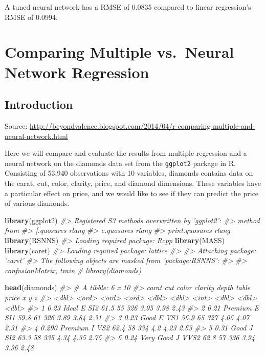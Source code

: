 \documentclass[]{book}
\newenvironment{Shaded}{\begin{snugshade}}{\end{snugshade}}
\newcommand{\CommentTok}[1]{\textcolor[rgb]{0.56,0.35,0.01}{\textit{#1}}}
\newcommand{\KeywordTok}[1]{\textcolor[rgb]{0.13,0.29,0.53}{\textbf{#1}}}
\newcommand{\NormalTok}[1]{#1}
\begin{document}
A tuned neural network has a RMSE of 0.0835 compared to linear regression's RMSE of 0.0994.

\hypertarget{comparing-multiple-vs.neural-network-regression}{%
\chapter{Comparing Multiple vs.~Neural Network Regression}\label{comparing-multiple-vs.neural-network-regression}}

\hypertarget{introduction-3}{%
\section{Introduction}\label{introduction-3}}

Source: \url{http://beyondvalence.blogspot.com/2014/04/r-comparing-multiple-and-neural-network.html}

Here we will compare and evaluate the results from multiple regression and a neural network on the diamonds data set from the \texttt{ggplot2} package in R. Consisting of 53,940 observations with 10 variables, diamonds contains data on the carat, cut, color, clarity, price, and diamond dimensions. These variables have a particular effect on price, and we would like to see if they can predict the price of various diamonds.

\begin{Shaded}
\begin{Highlighting}[]
\KeywordTok{library}\NormalTok{(ggplot2)}
\CommentTok{#> Registered S3 methods overwritten by 'ggplot2':}
\CommentTok{#>   method         from }
\CommentTok{#>   [.quosures     rlang}
\CommentTok{#>   c.quosures     rlang}
\CommentTok{#>   print.quosures rlang}
\KeywordTok{library}\NormalTok{(RSNNS)}
\CommentTok{#> Loading required package: Rcpp}
\KeywordTok{library}\NormalTok{(MASS)}
\KeywordTok{library}\NormalTok{(caret)}
\CommentTok{#> Loading required package: lattice}
\CommentTok{#> }
\CommentTok{#> Attaching package: 'caret'}
\CommentTok{#> The following objects are masked from 'package:RSNNS':}
\CommentTok{#> }
\CommentTok{#>     confusionMatrix, train}
\CommentTok{# library(diamonds)}

\KeywordTok{head}\NormalTok{(diamonds)}
\CommentTok{#> # A tibble: 6 x 10}
\CommentTok{#>   carat cut       color clarity depth table price     x     y     z}
\CommentTok{#>   <dbl> <ord>     <ord> <ord>   <dbl> <dbl> <int> <dbl> <dbl> <dbl>}
\CommentTok{#> 1 0.23  Ideal     E     SI2      61.5    55   326  3.95  3.98  2.43}
\CommentTok{#> 2 0.21  Premium   E     SI1      59.8    61   326  3.89  3.84  2.31}
\CommentTok{#> 3 0.23  Good      E     VS1      56.9    65   327  4.05  4.07  2.31}
\CommentTok{#> 4 0.290 Premium   I     VS2      62.4    58   334  4.2   4.23  2.63}
\CommentTok{#> 5 0.31  Good      J     SI2      63.3    58   335  4.34  4.35  2.75}
\CommentTok{#> 6 0.24  Very Good J     VVS2     62.8    57   336  3.94  3.96  2.48}
\end{Highlighting}
\end{Shaded}
\end{document}
